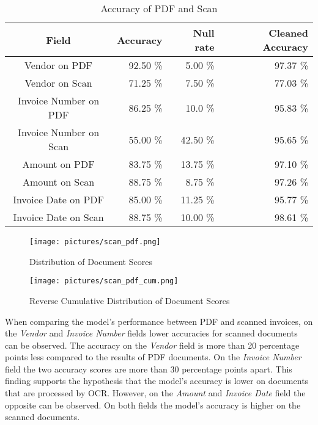 \begin{table}[ht]   %
    \centering
    \footnotesize
    \begin{tabular}{c|rrr} %
        \toprule    %
        Field  & Accuracy  & Null rate & Cleaned Accuracy \\
        \midrule    %
        Vendor on PDF    & 92.50 \%   &  5.00 \%   & 97.37 \% \\
        Vendor on Scan   & 71.25 \%   &  7.50 \%   & 77.03 \% \\
        \midrule    %
        Invoice Number on PDF & 86.25 \%   & 10.0 \%  & 95.83 \%\\
        Invoice Number on Scan & 55.00 \%  & 42.50 \%  & 95.65 \%\\
        \midrule    %
        Amount on PDF      & 83.75 \%   & 13.75 \%  & 97.10 \% \\
        Amount on Scan     & 88.75 \%   & 8.75 \%  & 97.26 \% \\
        \midrule    %
        Invoice Date on PDF  & 85.00 \%   & 11.25  \%  & 95.77 \% \\
        Invoice Date on Scan & 88.75 \%   & 10.00  \%  & 98.61 \% \\
        
        \bottomrule %
    \end{tabular}
    \caption{Accuracy of PDF and Scan}
    \label{table:Field_Com_Scan_PDF}
\end{table}

\begin{figure}[ht]
    \centering 
    \texttt{[image: pictures/scan\_pdf.png]}
    \caption{Distribution of Document Scores}
    \label{pic:scan_pdf_1}    %
\end{figure}
\begin{figure}[ht]
    \centering 
    \texttt{[image: pictures/scan\_pdf\_cum.png]}
    \caption{Reverse Cumulative Distribution of Document Scores}
    \label{pic:scan_pdf_1_cum}    %
\end{figure}

When comparing the model's performance between PDF and scanned invoices, on the \textit{Vendor} and \textit{Invoice Number} fields lower accuracies for scanned documents can be observed. The accuracy on the \textit{Vendor} field is more than 20 percentage points less compared to the results of PDF documents. On the \textit{Invoice Number} field the two accuracy scores are more than 30 percentage points apart. This finding supports the hypothesis that the model's accuracy is lower on documents that are processed by \ac{OCR}.
However, on the \textit{Amount} and \textit{Invoice Date} field the opposite can be observed. On both fields the model's accuracy is higher on the scanned documents.

